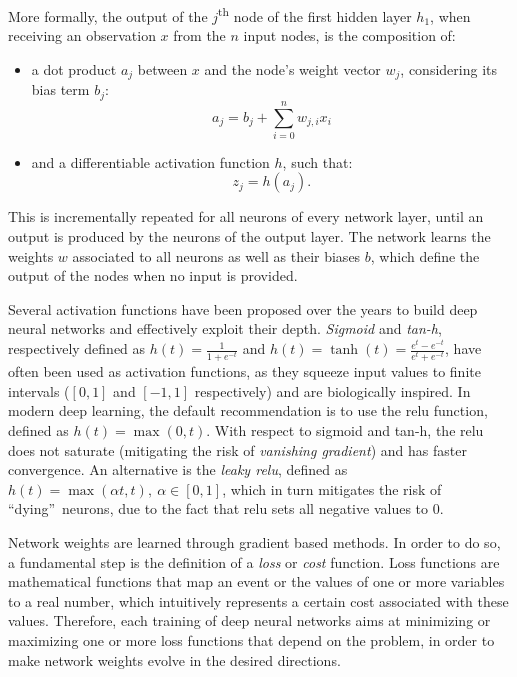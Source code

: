 \documentclass[%
    corpo=12pt,
    twoside,
    stile=classica,   
    tipotesi=magistrale,
    evenboxes,
    english,
	numerazioneromana,
]{toptesi}
\begin{document}
\bigskip
More formally, the output of the $j$\textsuperscript{th} node of the first hidden layer $h_1$, when receiving an observation $x$ from the $n$ input nodes, is the composition of:
\begin{itemize}
	\item a dot product $a_j$ between $x$ and the node's weight vector $w_j$, considering its bias term $b_j$:
	\begin{equation*}
		a_j = b_j + \sum_{i=0}^n w_{j,i}x_i
	\end{equation*}
	\item and a differentiable activation function $h$, such that:
	\begin{equation*}
		z_j = h(a_j)\text{.}
	\end{equation*}
\end{itemize}
This is incrementally repeated for all neurons of every network layer, until an output is produced by the neurons of the output layer. The network learns the weights $w$ associated to all neurons as well as their biases $b$, which define the output of the nodes when no input is provided\cite{amini2015apprentissage}.

\bigskip
Several activation functions have been proposed over the years to build deep neural networks and effectively exploit their depth. \textit{Sigmoid} and \textit{tan-h}, respectively defined as $h(t) = \frac{1}{1 + e^{-t}}$ and $h(t) = \tanh(t) = \frac{e^t - e^{-t}}{e^t + e^{-t}}$, have often been used as activation functions, as they squeeze input values to finite intervals ($[0,1]$ and $[-1,1]$ respectively) and are biologically inspired. In modern deep learning, the default recommendation is to use the \gls{relu} function, defined as $h(t) = \max(0,t)$. With respect to sigmoid and tan-h, the \gls{relu} does not saturate (mitigating the risk of \textit{vanishing gradient}) and has faster convergence. An alternative is the \textit{leaky \gls{relu}}, defined as $h(t) = \max(\alpha t, t),\ \alpha \in [0,1]$, which in turn mitigates the risk of \textquotedblleft dying\textquotedblright~neurons, due to the fact that \gls{relu} sets all negative values to $0$.

\bigskip
Network weights are learned through gradient based methods. In order to do so, a fundamental step is the definition of a \textit{loss} or \textit{cost} function. Loss functions are mathematical functions that map an event or the values of one or more variables to a real number, which intuitively represents a certain cost associated with these values. Therefore, each training of deep neural networks aims at minimizing or maximizing one or more loss functions that depend on the problem, in order to make network weights evolve in the desired directions. 
\end{document}
